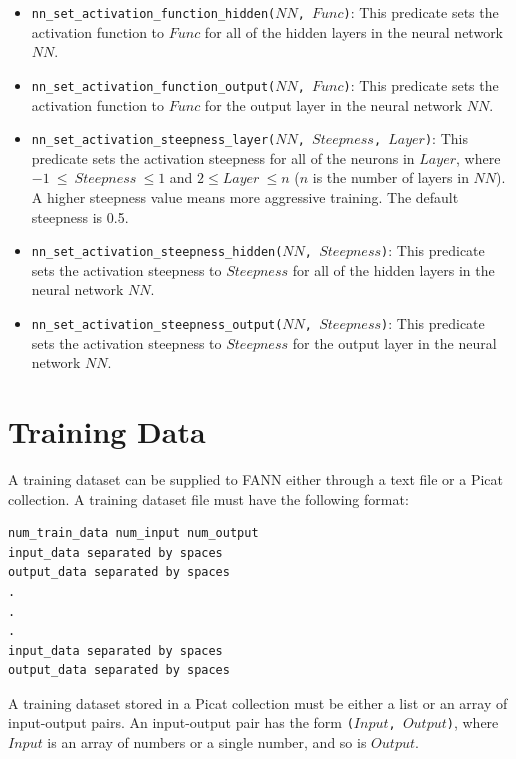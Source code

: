 \begin{itemize}
\item \texttt{nn\_set\_activation\_function\_hidden($NN$, $Func$)}: This predicate sets the activation function to $Func$ for all of the hidden layers in the neural network $NN$.

\item \texttt{nn\_set\_activation\_function\_output($NN$, $Func$)}: This predicate sets the activation function to $Func$ for the output layer in the neural network $NN$.

\item \texttt{nn\_set\_activation\_steepness\_layer($NN$, $Steepness$, $Layer$)}: This predicate sets the activation steepness for all of the neurons in $Layer$, where $-1\ \le\ Steepness\ \le 1$ and $2 \le Layer\ \le n$ ($n$ is the number of layers in $NN$).  A higher steepness value means more aggressive training. The default steepness is 0.5.

\item \texttt{nn\_set\_activation\_steepness\_hidden($NN$, $Steepness$)}: This predicate sets the activation steepness to $Steepness$ for all of the hidden layers in the neural network $NN$.

\item \texttt{nn\_set\_activation\_steepness\_output($NN$, $Steepness$)}: This predicate sets the activation steepness to $Steepness$ for the output layer in the neural network $NN$.
\end{itemize}

\section{Training Data}
A training dataset can be supplied to FANN either through a text file or a Picat collection. A training dataset file must have the following format:

\begin{verbatim}
num_train_data num_input num_output
input_data separated by spaces
output_data separated by spaces
.
.
.
input_data separated by spaces
output_data separated by spaces
\end{verbatim}
A training dataset stored in a Picat collection must be either a list or an array of input-output pairs. An input-output pair has the form \texttt{($Input$, $Output$)}, where $Input$ is an array of numbers or a single number, and so is $Output$.

